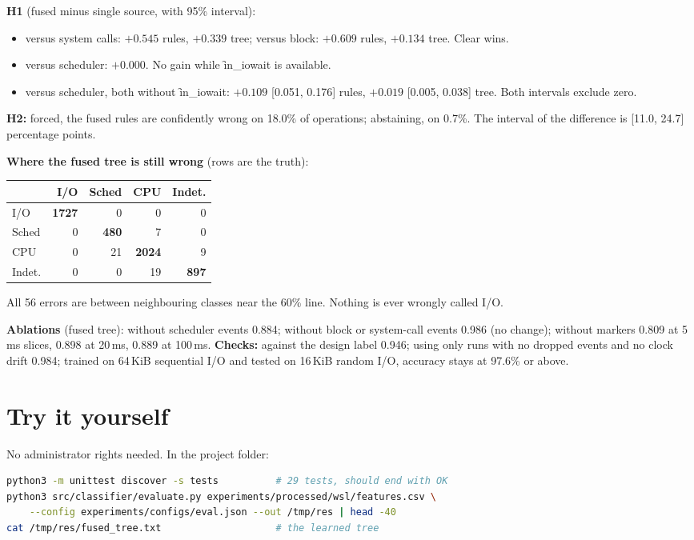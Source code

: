 \documentclass[11pt]{article}
\begin{document}
\textbf{H1} (fused minus single source, with 95\% interval):
\begin{itemize}
\item versus system calls: $+0.545$ rules, $+0.339$ tree; versus block: $+0.609$ rules, $+0.134$ tree. Clear wins.
\item versus scheduler: $+0.000$. No gain while \f{in\_iowait} is available.
\item versus scheduler, both without \f{in\_iowait}: $+0.109$ [0.051, 0.176] rules, $+0.019$ [0.005, 0.038] tree. Both intervals exclude zero.
\end{itemize}

\textbf{H2:} forced, the fused rules are confidently wrong on 18.0\% of operations; abstaining, on 0.7\%. The interval of the difference is [11.0, 24.7] percentage points.

\textbf{Where the fused tree is still wrong} (rows are the truth):
\begin{center}
\begin{tabular}{@{}lrrrr@{}}
\toprule
 & I/O & Sched & CPU & Indet. \\
\midrule
I/O & \textbf{1727} & 0 & 0 & 0 \\
Sched & 0 & \textbf{480} & 7 & 0 \\
CPU & 0 & 21 & \textbf{2024} & 9 \\
Indet. & 0 & 0 & 19 & \textbf{897} \\
\bottomrule
\end{tabular}
\end{center}
All 56 errors are between neighbouring classes near the 60\% line. Nothing is ever wrongly called I/O.

\textbf{Ablations} (fused tree): without scheduler events 0.884; without block or system-call events 0.986 (no change); without markers 0.809 at 5\,ms slices, 0.898 at 20\,ms, 0.889 at 100\,ms. \textbf{Checks:} against the design label 0.946; using only runs with no dropped events and no clock drift 0.984; trained on 64\,KiB sequential I/O and tested on 16\,KiB random I/O, accuracy stays at 97.6\% or above.

\section{Try it yourself}

No administrator rights needed. In the project folder:

\begin{lstlisting}[language=bash]
python3 -m unittest discover -s tests          # 29 tests, should end with OK
python3 src/classifier/evaluate.py experiments/processed/wsl/features.csv \
    --config experiments/configs/eval.json --out /tmp/res | head -40
cat /tmp/res/fused_tree.txt                    # the learned tree
\end{lstlisting}
\end{document}

